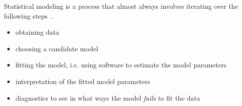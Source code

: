 Statistical modeling is a process that almost always involves iterating
over the following steps~\cite{chambers:1992}.
\begin{itemize}
\item obtaining data 
\item choosing a candidate model 
\item fitting the model, i.e. using software to  estimate the model parameters
\item interpretation of the fitted model parameters
\item diagnostics to see in what ways the model \emph{fails} to fit the data
\end{itemize}

\begin{comment}

The automobile data is available as a data frame that comes with
the \texttt{rpart} package. 
If you don't already have this package installed, then
\begin{Verbatim}
install.packages(``rpart'')
library(rpart)
attach(car.test.frame)
\end{Verbatim}
Having the data and a candidate model, let's fit the model
and plot \texttt{Mileage} against the values predicted by the model.
\begin{Verbatim}[samepage=true]
fm <- lm(Mileage ~ Weight + Disp.)
plot(fitted(fm), Mileage)
abline(0, 1, lty=2)
\end{Verbatim}
\texttt{[image: Mileage-vs-fitted.pdf]}

The dashed line in the plot represents a perfect fit. Qualitatively,
the model is doing pretty well, except for cars with high gas mileage.
Those points fall above the dashed line, an indication that the
predictions are too low. Let's try two different ways to improve the model,
1) by adding additional predictor variables to the model, and 2)
by changing our concept of how the data generating process should
be modeled. For example, let's suppose that we know something about
the physics of internal combustion engines in automobiles. Consequently,
we feel that fuel consumption is more natural than mileage as a
variable to relate linearly to weight. Noting that \texttt{Mileage}
is in units of miles per gallon, we can define fuel consumption in gallons per
100 miles driven as
\begin{Verbatim}
Fuel <- 100/Mileage
\end{Verbatim}
In other words, we want to try using the inverse of mileage as the
response variable.


\end{comment}
